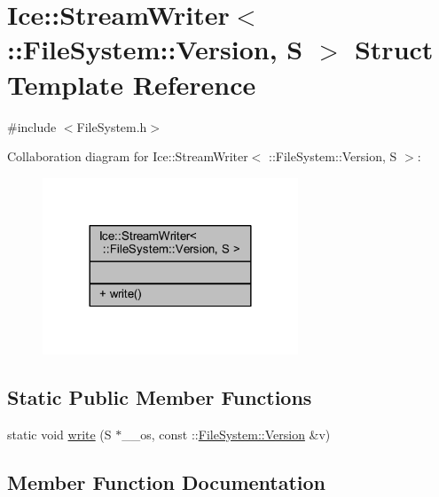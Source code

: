 \hypertarget{struct_ice_1_1_stream_writer_3_01_1_1_file_system_1_1_version_00_01_s_01_4}{}\section{Ice\+:\+:Stream\+Writer$<$ \+:\+:File\+System\+:\+:Version, S $>$ Struct Template Reference}
\label{struct_ice_1_1_stream_writer_3_01_1_1_file_system_1_1_version_00_01_s_01_4}


{\ttfamily \#include $<$File\+System.\+h$>$}



Collaboration diagram for Ice\+:\+:Stream\+Writer$<$ \+:\+:File\+System\+:\+:Version, S $>$\+:
\nopagebreak
\begin{figure}[H]
\begin{center}
\leavevmode
\includegraphics[width=216pt]{struct_ice_1_1_stream_writer_3_01_1_1_file_system_1_1_version_00_01_s_01_4__coll__graph}
\end{center}
\end{figure}
\subsection*{Static Public Member Functions}
\begin{DoxyCompactItemize}
\item 
static void \hyperlink{struct_ice_1_1_stream_writer_3_01_1_1_file_system_1_1_version_00_01_s_01_4_a6051f810c94db3d5d8bc00df1ac2fac5}{write} (S $\ast$\+\_\+\+\_\+os, const \+::\hyperlink{struct_file_system_1_1_version}{File\+System\+::\+Version} \&v)
\end{DoxyCompactItemize}


\subsection{Member Function Documentation}
\hypertarget{struct_ice_1_1_stream_writer_3_01_1_1_file_system_1_1_version_00_01_s_01_4_a6051f810c94db3d5d8bc00df1ac2fac5}{}
